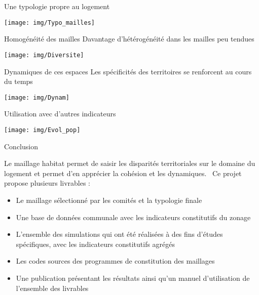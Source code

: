 \documentclass[11pt]{beamer}
\begin{document}
\begin{frame}{Une typologie propre au logement}
\begin{center}
\texttt{[image: img/Typo\_mailles]}
\end{center}
\end{frame}

\begin{frame}{Homogénéité des mailles}
Davantage d'hétérogénéité dans les mailles peu tendues
\begin{center}
\texttt{[image: img/Diversite]}
\end{center}
\end{frame}

\begin{frame}{Dynamiques de ces espaces}
Les spécificités des territoires se renforcent au cours du temps 
\begin{center}
\texttt{[image: img/Dynam]}
\end{center}
\end{frame}

\begin{frame}{Utilisation avec d'autres indicateurs}
\begin{center}
\texttt{[image: img/Evol\_pop]}
\end{center}
\end{frame}


\begin{frame}{Conclusion}

Le maillage habitat permet de saisir les disparités territoriales sur le domaine du logement et permet d'en apprécier la cohésion et les dynamiques. \
Ce projet propose plusieurs livrables :
\begin{itemize}
\item Le maillage sélectionné par les comités et la typologie finale
\item Une base de données communale avec les indicateurs constitutifs du zonage
\item L'ensemble des simulations qui ont été réalisées à des fins d'études spécifiques, avec les indicateurs constitutifs agrégés
\item Les codes sources des programmes de constitution des maillages
\item Une publication présentant les résultats ainsi qu'un manuel d'utilisation de l'ensemble des livrables
\end{itemize}
\end{frame}
\end{document}
